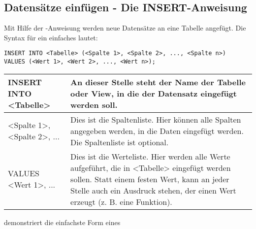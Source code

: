       \subsection{Datens\"atze einf\"ugen - Die INSERT-Anweisung}
        Mit Hilfe der \INSERT-Anweisung werden neue Datens\"atze an eine Tabelle
        angef\"ugt. Die Syntax f\"ur ein einfaches \INSERT lautet:
        \begin{lstlisting}[language=oracle_sql,caption={Die INSERT Anweisungen},label=sql07_01]
INSERT INTO <Tabelle> (<Spalte 1>, <Spalte 2>, ..., <Spalte n>)
VALUES (<Wert 1>, <Wert 2>, ..., <Wert n>);
        \end{lstlisting}
        \begin{center}
          \label{insertsyntax}
          \begin{small}
            \tabletail{
              \hline
            }
            \tablelasttail{
              \hline
            }
            \begin{supertabular}{|l|p{10.8cm}|}
              INSERT INTO <Tabelle> & An dieser Stelle steht der Name der
              Tabelle oder View, in die der Datensatz eingef\"ugt werden soll.
              \\
              \hline
              <Spalte 1>, <Spalte 2>, ... & Dies ist die Spaltenliste. Hier
              k\"onnen alle Spalten angegeben werden, in die Daten eingef\"ugt
              werden. Die Spaltenliste ist optional. \\
              \hline
              VALUES <Wert 1>, ... & Dies ist die Werteliste. Hier werden alle
              Werte aufgef\"uhrt, die in <Tabelle> eingef\"ugt werden sollen.
              Statt einem festen Wert, kann an jeder Stelle auch ein Ausdruck
              stehen, der einen Wert erzeugt (z. B. eine Funktion). \\
            \end{supertabular}
          \end{small}
        \end{center}
         demonstriert die einfachste Form eines
